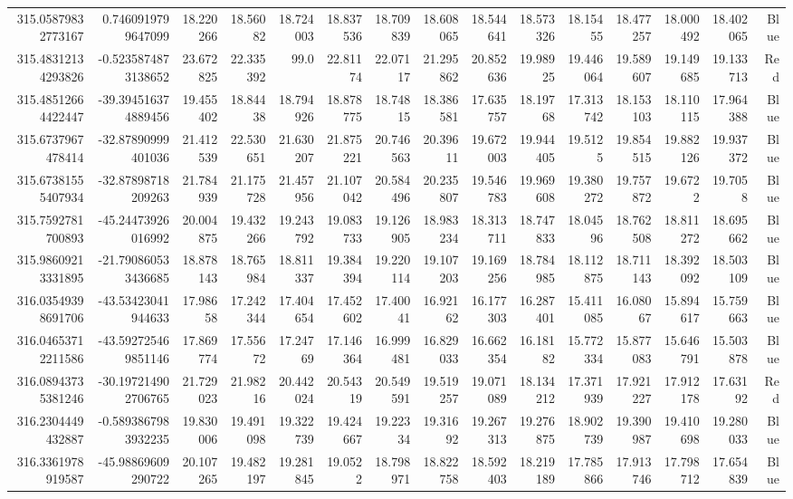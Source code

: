 \begin{center}
\begin{longtable}{rrrrrrrrrrrrrrr}
315.05879832773167 & 0.7460919799647099 & 18.220266 & 18.56082 & 18.724003 & 18.837536 & 18.709839 & 18.608065 & 18.544641 & 18.573326 & 18.15455 & 18.477257 & 18.000492 & 18.402065 & Blue \\
315.48312134293826 & -0.5235874873138652 & 23.672825 & 22.335392 & 99.0 & 22.81174 & 22.07117 & 21.295862 & 20.852636 & 19.98925 & 19.446064 & 19.589607 & 19.149685 & 19.133713 & Red \\
315.48512664422447 & -39.394516374889456 & 19.455402 & 18.84438 & 18.794926 & 18.878775 & 18.74815 & 18.386581 & 17.635757 & 18.19768 & 17.313742 & 18.153103 & 18.110115 & 17.964388 & Blue \\
315.6737967478414 & -32.87890999401036 & 21.412539 & 22.530651 & 21.630207 & 21.875221 & 20.746563 & 20.39611 & 19.672003 & 19.944405 & 19.5125 & 19.854515 & 19.882126 & 19.937372 & Blue \\
315.67381555407934 & -32.87898718209263 & 21.784939 & 21.175728 & 21.457956 & 21.107042 & 20.584496 & 20.235807 & 19.546783 & 19.969608 & 19.380272 & 19.757872 & 19.6722 & 19.7058 & Blue \\
315.7592781700893 & -45.24473926016992 & 20.004875 & 19.432266 & 19.243792 & 19.083733 & 19.126905 & 18.983234 & 18.313711 & 18.747833 & 18.04596 & 18.762508 & 18.811272 & 18.695662 & Blue \\
315.98609213331895 & -21.790860533436685 & 18.878143 & 18.765984 & 18.811337 & 19.384394 & 19.220114 & 19.107203 & 19.169256 & 18.784985 & 18.112875 & 18.711143 & 18.392092 & 18.503109 & Blue \\
316.03549398691706 & -43.53423041944633 & 17.98658 & 17.242344 & 17.404654 & 17.452602 & 17.40041 & 16.92162 & 16.177303 & 16.287401 & 15.411085 & 16.08067 & 15.894617 & 15.759663 & Blue \\
316.04653712211586 & -43.592725469851146 & 17.869774 & 17.55672 & 17.24769 & 17.146364 & 16.999481 & 16.829033 & 16.662354 & 16.18182 & 15.772334 & 15.877083 & 15.646791 & 15.503878 & Blue \\
316.08943735381246 & -30.197214902706765 & 21.729023 & 21.98216 & 20.442024 & 20.54319 & 20.549591 & 19.519257 & 19.071089 & 18.134212 & 17.371939 & 17.921227 & 17.912178 & 17.63192 & Red \\
316.2304449432887 & -0.5893867983932235 & 19.830006 & 19.491098 & 19.322739 & 19.424667 & 19.22334 & 19.31692 & 19.267313 & 19.276875 & 18.902739 & 19.390987 & 19.410698 & 19.280033 & Blue \\
316.3361978919587 & -45.98869609290722 & 20.107265 & 19.482197 & 19.281845 & 19.0522 & 18.798971 & 18.822758 & 18.592403 & 18.219189 & 17.785866 & 17.913746 & 17.798712 & 17.654839 & Blue \\

\end{longtable}
\end{center}
